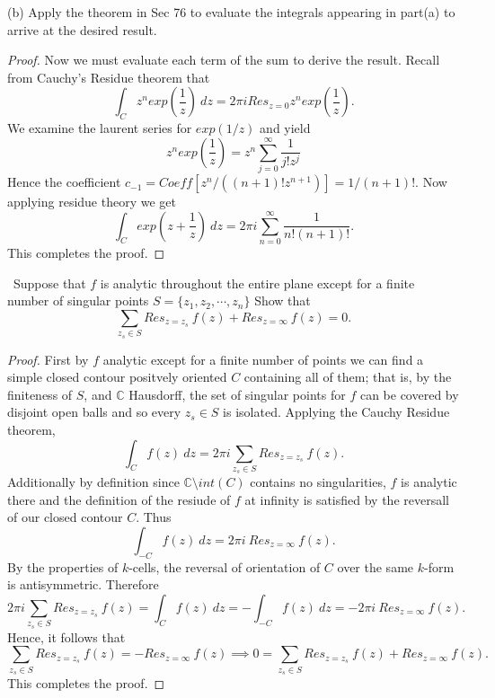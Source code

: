 \documentclass[11pt]{amsart}
\theoremstyle{definition}
\numberwithin{theorem}{section}
\numberwithin{definition}{section}
\numberwithin{equation}{section}
\begin{document}
(b) Apply the theorem in Sec 76 to evaluate the integrals appearing in part(a) to arrive at the desired result.
\begin{proof}
	Now we must evaluate each term of the sum to derive the result. Recall from Cauchy's Residue theorem that 
	\begin{equation*}
		\int_C z^n exp\left(\frac{1}{z}\right)\ dz = 2\pi i Res_{z=0}z^n exp\left(\frac{1}{z}\right).
	\end{equation*}
	We examine the laurent series for $exp(1/z)$ and yield
	\begin{equation*}
		z^n exp\left(\frac{1}{z}\right) = z^n \sum_{j=0}^\infty \frac{1}{j!z^{j}}
	\end{equation*}
	Hence the coefficient $c_{-1} = Coeff[z^{n}/((n+1)!z^{n+1})] = 1/(n+1)!.$ Now applying residue theory we get
	\begin{equation*}
	\int_C exp\left(z + \frac{1}{z}\right)\ dz = 2\pi i \sum_{n=0}^\infty \frac{1}{n!(n+1)!}.
	\end{equation*}
	This completes the proof.
\end{proof}
\medskip {}\ Suppose that $f$ is analytic throughout the entire plane except for a finite number of singular points $S = \{z_1, z_2, \cdots, z_n\}$ Show that 
\begin{equation*}
	\sum_{z_s \in S} Res_{z= z_s}\ f(z) + Res_{z=\infty}\ f(z) = 0.
\end{equation*}
\begin{proof}
	First by $f$ analytic except for a finite number of points we can find a simple closed contour positvely oriented $C$ containing all of them; that is, by the finiteness of $S$, and $\mathbb{C}$ Hausdorff, the set of singular points for $f$ can be covered by disjoint open balls and so every $z_s \in S$ is isolated. Applying the Cauchy Residue theorem,
	\begin{equation*}
		\int_C f(z)\ dz = 2\pi i \sum_{z_s \in S} Res_{z= z_s}\ f(z).
	\end{equation*}
	Additionally by definition since $\mathbb{C} \setminus int(C)$ contains no singularities, $f$ is analytic there and the definition of the resiude of $f$ at infinity is satisfied by  the reversall of our closed contour $C$. Thus
	\begin{equation*}
		\int_{-C} f(z)\ dz = 2\pi i\ Res_{z=\infty}\ f(z).
	\end{equation*}
	By the properties of $k$-cells, the reversal of orientation of $C$ over the same $k$-form is antisymmetric. Therefore
	\begin{equation*}
		 2\pi i \sum_{z_s \in S} Res_{z= z_s}\ f(z) = \int_C f(z)\ dz = -\int_{-C} f(z)\ dz = -2\pi i\ Res_{z=\infty}\ f(z).
	\end{equation*}
	Hence, it follows that 
	\begin{equation*}
	\sum_{z_s \in S} Res_{z= z_s}\ f(z) = - Res_{z=\infty}\ f(z) \implies 0 = 
	\sum_{z_s \in S} Res_{z= z_s}\ f(z) + Res_{z=\infty}\ f(z).
	\end{equation*}
	This completes the proof.
\end{proof}
\end{document}
